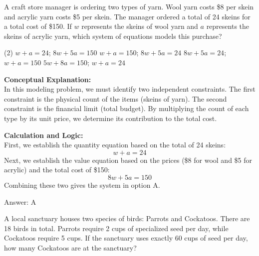 \documentclass[11pt,paper=a4,answers]{exam}
\begin{document}
\begin{questions}
\pointsinrightmargin
\pointsdroppedatright
\marksnotpoints
{}
\pointformat{\boldmath\themarginpoints}
\bracketedpoints



\question
A craft store manager is ordering two types of yarn. Wool yarn costs \$8 per skein and acrylic yarn costs \$5 per skein. The manager ordered a total of 24 skeins for a total cost of \$150. If $w$ represents the skeins of wool yarn and $a$ represents the skeins of acrylic yarn, which system of equations models this purchase?
\begin{tasks}(2)
    \task $w + a = 24$; $8w + 5a = 150$
    \task $w + a = 150$; $8w + 5a = 24$
    \task $8w + 5a = 24$; $w + a = 150$
    \task $5w + 8a = 150$; $w + a = 24$
\end{tasks}

\begin{solution}
\textbf{Conceptual Explanation:} \\
In this modeling problem, we must identify two independent constraints. The first constraint is the physical count of the items (skeins of yarn). The second constraint is the financial limit (total budget). By multiplying the count of each type by its unit price, we determine its contribution to the total cost.

\vspace{10pt}
\textbf{Calculation and Logic:} \\
First, we establish the quantity equation based on the total of 24 skeins:
\[w + a = 24\]
Next, we establish the value equation based on the prices (\$8 for wool and \$5 for acrylic) and the total cost of \$150:
\[8w + 5a = 150\]
Combining these two gives the system in option A.

\vspace{15pt}
Answer: \colorbox{yellow!100}{A}
\end{solution}

\question
A local sanctuary houses two species of birds: Parrots and Cockatoos. There are 18 birds in total. Parrots require 2 cups of specialized seed per day, while Cockatoos require 5 cups. If the sanctuary uses exactly 60 cups of seed per day, how many Cockatoos are at the sanctuary?


\end{questions}
\end{document}

